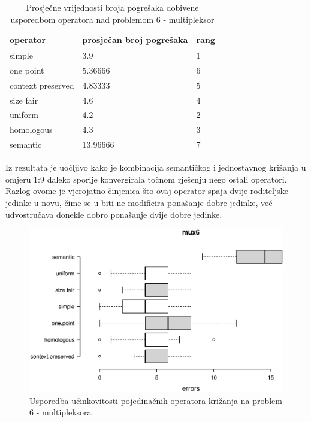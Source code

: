 \begin{table}[H]
 	\centering

    \begin{tabular}{| l | l | l |}
    \hline
    \textbf{operator}  & \textbf{prosječan broj pogrešaka} & \textbf{rang}\\ \hline
    simple & 3.9 & 1\\ \hline
    one point & 5.36666 & 6\\ \hline
    context preserved & 4.83333 & 5\\ \hline
    size fair & 4.6 & 4\\ \hline
    uniform & 4.2 & 2\\ \hline
    homologous & 4.3 & 3\\ \hline
    semantic & 13.96666 & 7\\ \hline
    \end{tabular}
    
    \caption{Prosječne vrijednosti broja pogrešaka dobivene usporedbom operatora nad problemom 6 - multipleksor}
    \label{mux6table}
\end{table}

Iz rezultata je uočljivo kako je kombinacija semantičkog i jednostavnog križanja u omjeru 1:9 daleko sporije konvergirala točnom rješenju nego ostali operatori. Razlog ovome je vjerojatno činjenica što ovaj operator spaja dvije roditeljske jedinke u novu, čime se u biti ne modificira ponašanje dobre jedinke, već udvostručava donekle dobro ponašanje dvije dobre jedinke.

\begin{figure}[H]
	\centering
	\includegraphics[trim=0cm 4cm 0cm 0cm, scale=0.6]{./slike/boxPlots/mux6.eps}
	\caption{Usporedba učinkovitosti pojedinačnih operatora križanja na problem 6 - multipleksora}
	\label{muxbox}
\end{figure}

